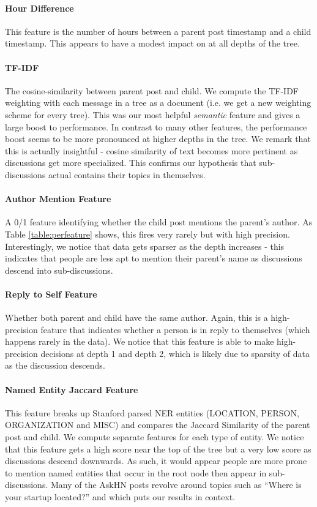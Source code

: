\documentclass{article}
\begin{document}
\paragraph{Hour Difference} This feature is the number of hours between a parent 
post timestamp and a child timestamp. This appears to have a modest impact on
at all depths of the tree.

\paragraph{TF-IDF} The cosine-similarity between parent post and child. We compute the 
TF-IDF weighting with each message in a tree as a document (i.e. we get a new
weighting scheme for every tree). This was our most helpful \textit{semantic}
feature and gives a large boost to performance. In contrast to many other
features, the performance boost seems to be more pronounced at higher depths
in the tree. We remark that this is actually insightful - cosine similarity of
text becomes more pertinent as discussions get more specialized. This confirms
our hypothesis that sub-discussions actual contains their topics in
themselves.

\paragraph{Author Mention Feature} A 0/1 feature identifying whether the child 
post mentions the parent's author. As Table \ref{table:perfeature} shows, this
fires very rarely but with high precision. Interestingly, we notice that data
gets sparser as the depth increases - this indicates that people are less apt
to mention their parent's name as discussions descend into sub-discussions.

\paragraph{Reply to Self Feature} Whether both parent and child have the same
author. Again, this is a high-precision feature that indicates whether a
person is in reply to themselves (which happens rarely in the data). We notice
that this feature is able to make high-precision decisions at depth 1 and
depth 2, which is likely due to sparsity of data as the discussion descends.

\paragraph{Named Entity Jaccard Feature} This feature breaks up Stanford parsed NER
entities (LOCATION, PERSON, ORGANIZATION and MISC) and compares the Jaccard
Similarity of the parent post and child. We compute separate features for each
type of entity. We notice that this feature gets a high score near the top of
the tree but a very low score as  discussions descend downwards. As such, it
would appear people are more prone to mention named entities that occur in the
root node then appear in sub-discussions. Many of the AskHN posts revolve
around topics such as ``Where is your startup located?'' and which puts our
results in context.
\end{document}
